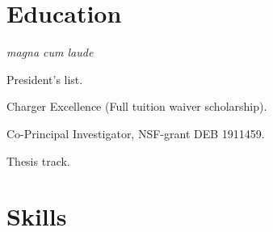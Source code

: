 \documentclass[]{CustomCV}
\begin{document}
\vspace{-5pt} %

\section{Education}
\vspace{-5pt} %
\begin{tightemize}
    \sectionsep
    \item \textit {magna cum laude}
    \item President's list.
    \item Charger Excellence (Full tuition waiver scholarship).
\end{tightemize}
\sectionsep

\vspace{-5pt} %
\begin{tightemize}
    \sectionsep
    \item Co-Principal Investigator, NSF-grant DEB 1911459.
    \item Thesis track.
\end{tightemize}
\sectionsep

\section{Skills}
\end{document}
